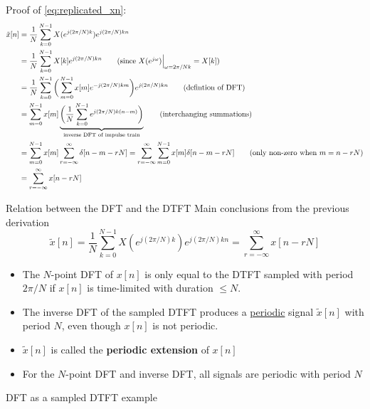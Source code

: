 \documentclass[10pt, handout]{beamer}
\begin{document}
%
\begin{frame}

Proof of \eqref{eq:replicated_xn}:
\begin{align*}
	\tilde{x}[n] &= \frac{1}{N}\sum_{k=0}^{N-1}X(e^{j(2\pi/N)k})e^{j(2\pi/N)kn} \\
	&= \frac{1}{N}\sum_{k=0}^{N-1}X[k]e^{j(2\pi/N)kn} \tag{since $X(e^{j\omega})\Big|_{\omega = 2\pi/Nk} = X[k]$} \\
	&= \frac{1}{N}\sum_{k=0}^{N-1}\bigg(\sum_{m=0}^{N-1}x[m]e^{-j(2\pi/N)km}\bigg)e^{j(2\pi/N)kn} \tag{defintion of DFT} \\
	&= \sum_{m=0}^{N-1}x[m]\underbrace{\bigg(\frac{1}{N}\sum_{k=0}^{N-1}e^{j(2\pi/N)k(n-m)}\bigg)}_{\text{inverse DFT of impulse train}} \tag{interchanging summations} \\
	&= \sum_{m=0}^{N-1}x[m]\sum_{r=-\infty}^{\infty}\delta[n-m-rN] = \sum_{r=-\infty}^{\infty}\sum_{m=0}^{N-1}x[m]\delta[n-m-rN] \tag{only non-zero when $m = n-rN$}\\
	&= \sum_{r=-\infty}^{\infty}x[n-rN]
\end{align*}
\end{frame}

%
\begin{frame}{Relation between the DFT and the DTFT}
	Main conclusions from the previous derivation
	\begin{equation*} 
	\tilde{x}[n] = \frac{1}{N}\sum_{k=0}^{N-1}X(e^{j(2\pi/N)k})e^{j(2\pi/N)kn} = \sum_{r=-\infty}^{\infty} x[n-rN]
	\end{equation*}
	
	\begin{itemize}
		\item The $N$-point DFT of $x[n]$ is only equal to the DTFT sampled with period $2\pi/N$ if $x[n]$ is time-limited with duration $\leq N$.  
		\item The inverse DFT of the sampled DTFT produces a \underline{periodic} signal $\tilde{x}[n]$ with period $N$, even though $x[n]$ is not periodic.
		\item $\tilde{x}[n]$ is called the \textbf{periodic extension} of $x[n]$
		\item For the $N$-point DFT and inverse DFT, all signals are periodic with period $N$
	\end{itemize}
\end{frame}

%
\begin{frame}{DFT as a sampled DTFT example}
\vspace{-0.25cm}
\begin{center}
	\def\N{3}
	\def\Ns{8}
	\resizebox{\linewidth}{!}{}
\end{center}
\end{frame}
\end{document}
